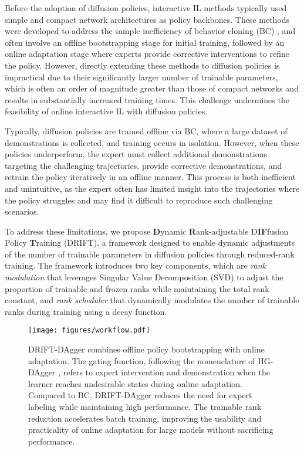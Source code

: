 Before the adoption of diffusion policies, interactive IL methods typically used simple and compact network architectures as policy backbones. These methods were developed to address the sample inefficiency of behavior cloning (BC) \cite{sun_il, zare_il_survey}, and often involve an offline bootstrapping stage for initial training, followed by an online adaptation stage where experts provide corrective interventions to refine the policy. However, directly extending these methods to diffusion policies is impractical due to their significantly larger number of trainable parameters, which is often an order of magnitude greater than those of compact networks and results in substantially increased training times. This challenge undermines the feasibility of online interactive IL with diffusion policies.


Typically, diffusion policies are trained offline via BC, where a large dataset of demonstrations is collected, and training occurs in isolation. However, when these policies underperform, the expert must collect additional demonstrations targeting the challenging trajectories, provide corrective demonstrations, and retrain the policy iteratively in an offline manner. This process is both inefficient and unintuitive, as the expert often has limited insight into the trajectories where the policy struggles and may find it difficult to reproduce such challenging scenarios.

To address these limitations, we propose \textbf{D}ynamic \textbf{R}ank-adjustable D\textbf{IF}fusion Policy \textbf{T}raining (DRIFT), a framework designed to enable dynamic adjustments of the number of trainable parameters in diffusion policies through reduced-rank training. The framework introduces two key components, which are \emph{rank modulation} that leverages Singular Value Decomposition (SVD) \cite{strang2022introduction} to adjust the proportion of trainable and frozen ranks while maintaining the total rank constant, and \emph{rank scheduler} that dynamically modulates the number of trainable ranks during training using a decay function.


\begin{figure}
\centering
\texttt{[image: figures/workflow.pdf]}
\caption{DRIFT-DAgger combines offline policy bootstrapping with online adaptation. The gating function, following the nomenclature of HG-DAgger \cite{kelly_hg_dagger}, refers to expert intervention and demonstration when the learner reaches undesirable states during online adaptation. Compared to BC, DRIFT-DAgger reduces the need for expert labeling while maintaining high performance. The trainable rank reduction accelerates batch training, improving the usability and practicality of online adaptation for large models without sacrificing performance.}
\label{fig:workflow}
\end{figure}

